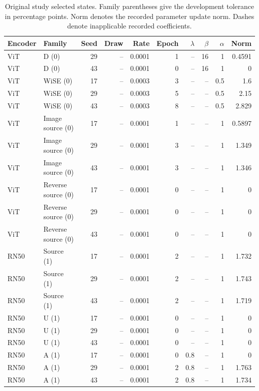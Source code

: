 \begin{table}[t]
\centering
\scriptsize
\setlength{\tabcolsep}{3pt}
\begin{tabular}{llrrrrrrrr}
\toprule
Encoder & Family & Seed & Draw & Rate & Epoch & $\lambda$ & $\beta$ & $\alpha$ & Norm\\
\midrule
ViT & D (0) & 29 & -- & 0.0001 & 1 & -- & 16 & 1 & 0.4591\\
ViT & D (0) & 43 & -- & 0.0001 & 0 & -- & 16 & 1 & 0\\
ViT & WiSE (0) & 17 & -- & 0.0003 & 3 & -- & -- & 0.5 & 1.6\\
ViT & WiSE (0) & 29 & -- & 0.0003 & 5 & -- & -- & 0.5 & 2.15\\
ViT & WiSE (0) & 43 & -- & 0.0003 & 8 & -- & -- & 0.5 & 2.829\\
ViT & Image source (0) & 17 & -- & 0.0001 & 1 & -- & -- & 1 & 0.5897\\
ViT & Image source (0) & 29 & -- & 0.0001 & 3 & -- & -- & 1 & 1.349\\
ViT & Image source (0) & 43 & -- & 0.0001 & 3 & -- & -- & 1 & 1.346\\
ViT & Reverse source (0) & 17 & -- & 0.0001 & 0 & -- & -- & 1 & 0\\
ViT & Reverse source (0) & 29 & -- & 0.0001 & 0 & -- & -- & 1 & 0\\
ViT & Reverse source (0) & 43 & -- & 0.0001 & 0 & -- & -- & 1 & 0\\
RN50 & Source (1) & 17 & -- & 0.0001 & 2 & -- & -- & 1 & 1.732\\
RN50 & Source (1) & 29 & -- & 0.0001 & 2 & -- & -- & 1 & 1.743\\
RN50 & Source (1) & 43 & -- & 0.0001 & 2 & -- & -- & 1 & 1.719\\
RN50 & U (1) & 17 & -- & 0.0001 & 0 & -- & -- & 1 & 0\\
RN50 & U (1) & 29 & -- & 0.0001 & 0 & -- & -- & 1 & 0\\
RN50 & U (1) & 43 & -- & 0.0001 & 0 & -- & -- & 1 & 0\\
RN50 & A (1) & 17 & -- & 0.0001 & 0 & 0.8 & -- & 1 & 0\\
RN50 & A (1) & 29 & -- & 0.0001 & 2 & 0.8 & -- & 1 & 1.763\\
RN50 & A (1) & 43 & -- & 0.0001 & 2 & 0.8 & -- & 1 & 1.734\\
\bottomrule
\end{tabular}
\caption{Original study selected states. Family parentheses give the development tolerance in percentage points. Norm denotes the recorded parameter update norm. Dashes denote inapplicable recorded coefficients.}\label{tab:originalselected40}
\end{table}



